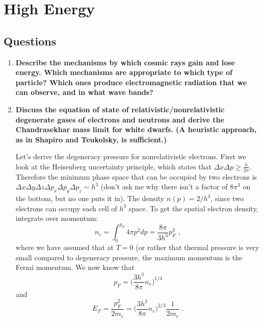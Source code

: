 \section{High Energy}
\subsection{Questions}
\begin{enumerate}
\item \textbf{Describe the mechanisms by which cosmic rays gain and lose energy. Which mechanisms
      are appropriate to which type of particle? Which ones produce electromagnetic
      radiation that we can observe, and in what wave bands?}
\item \textbf{Discuss the equation of state of relativistic/nonrelativistic degenerate gases of electrons
      and neutrons and derive the Chandrasekhar mass limit for white dwarfs. (A
      heuristic approach, as in Shapiro and Teukolsky, is sufficient.)}
      
      Let's derive the degeneracy pressure for nonrelativistic electrons. First we look at the Heisenberg uncertainty principle, which states that $\Delta x \Delta p \ge \frac{h}{2\pi}$. Therefore the minimum phase space that can be occupied by two electrons is $\Delta x \Delta y \Delta z \Delta p_x \Delta p_y \Delta p_z \sim h^3$ (don't ask me why there isn't a factor of $8 \pi^3$ on the bottom, but no one puts it in). The density $n(p) = 2/h^3$, since two electrons can occupy each cell of $h^3$ space. To get the spatial electron density, integrate over momentum:
      \begin{equation}
      n_e = \int_0^{p_F} 4\pi p^2 dp = \frac{8 \pi}{3 h^3} p_F^3\,\,,
      \end{equation}
      where we have assumed that at $T=0$ (or rather that thermal pressure is very small compared to degeneracy pressure, the maximum momentum is the Fermi momentum. We now know that
      \begin{equation}
      p_F = \biggl( \frac{3 h^3}{8 \pi} n_e \biggr) ^{1/3}
      \end{equation}
      and
      \begin{equation}
      E_F = \frac{p_F^2}{2m_e} = \biggl( \frac{3 h^3}{8 \pi} n_e \biggr) ^{2/3}\frac{1}{2m_e}\,\,.
      \end{equation}
      

\end{enumerate}
